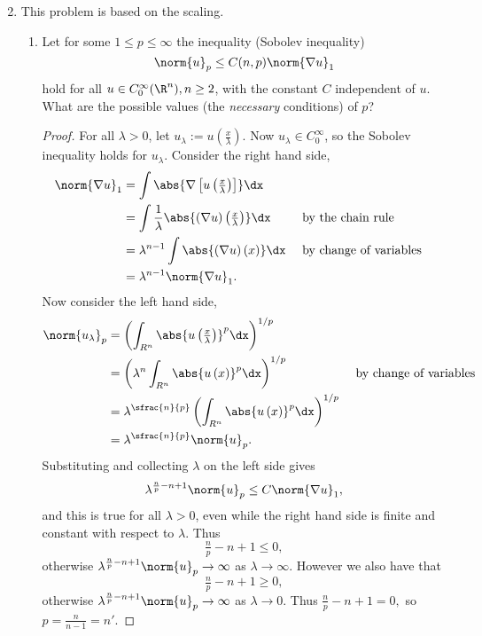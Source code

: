 \documentclass[12pt,letterpaper]{article}
\begin{document}
\begin{enumerate}
\setcounter{enumi}{1}
\item This problem is based on the scaling. 
	\begin{enumerate}[label=(\alph*)]
	\item Let for some $1\leq p\leq \infty$ the inequality (Sobolev inequality)
	$$\norm{u}_p\leq C(n,p)\norm{\nabla u}_1
	$$
	hold for all $u\in C_0^\infty(\R^n), n\geq2$, with the constant $C$ independent of $u$. What are the possible values (the \textit{necessary} conditions) of $p$?
	\begin{proof}
	For all $\lambda> 0$, let $u_\lambda:= u\left(\frac{x}{\lambda}\right)$. Now $u_\lambda\in C^\infty_0$, so the Sobolev inequality holds for $u_\lambda$. Consider the right hand side, 
	\begin{align*}
	\norm{\nabla u}_1 
	&= \int \abs{\nabla\left[u\left(\tfrac{x}{\lambda}\right)\right]}\dx \\
	&= \int \frac{1}{\lambda}\abs{\left(\nabla u\right)\left(\tfrac{x}{\lambda}\right)}\dx &&\text{ by the chain rule}\\
	&= \lambda^{n-1}\int \abs{\left(\nabla u\right)\left(x\right)}\dx &&\text{ by change of variables}\\
	&= \lambda^{n-1}\norm{\nabla u}_1.
	\end{align*}
	Now consider the left hand side,
	\begin{align*}
	\norm{u_\lambda}_p &= \left(\int_{R^n}\abs{u\left(\tfrac{x}{\lambda}\right)}^p\dx\right)^{1/p} \\
	&= \left(\lambda^{n}\int_{R^n}\abs{u\left(x\right)}^p\dx\right)^{1/p} &&\text{ by change of variables}\\
	&= \lambda^{\sfrac{n}{p}}\left(\int_{R^n}\abs{u\left(x\right)}^p\dx\right)^{1/p}\\
	&= \lambda^{\sfrac{n}{p}} \norm{u}_p.
	\end{align*}
	Substituting and collecting $\lambda$ on the left side gives 
	$$\lambda^{\frac{n}{p}-n+1}\norm{u}_p \leq C\norm{\nabla u}_1,
	$$
	and this is true for all $\lambda>0$, even while the right hand side is finite and constant with respect to $\lambda$. Thus 
	$$\tfrac{n}{p}-n+1\leq 0,	$$
	otherwise $\lambda^{\frac{n}{p}-n+1}\norm{u}_p\to\infty$ as $\lambda\to\infty$. However we also have that 
	$$\tfrac{n}{p}-n+1\geq 0,	$$
	otherwise $\lambda^{\frac{n}{p}-n+1}\norm{u}_p\to\infty$ as $\lambda\to0$.
	Thus $\tfrac{n}{p}-n+1= 0,	$ so $p=\frac{n}{n-1}=n'$. \qedwhitehere
	\end{proof}
	

\end{enumerate}
\end{enumerate}
\end{document}
